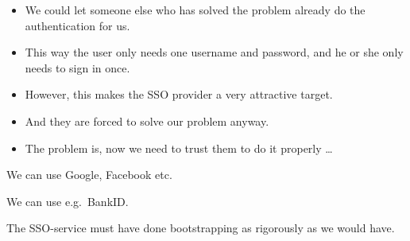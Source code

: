 \begin{frame}
  \begin{itemize}
    \item We could let someone else who has solved the problem already do the 
      authentication for us.

    \item This way the user only needs one username and password, and he or she 
      only needs to sign in once.

    \item However, this makes the SSO provider a very attractive target.

    \item And they are forced to solve our problem anyway.

    \item The problem is, now we need to trust them to do it properly \dots
  \end{itemize}
\end{frame}

\begin{frame}
  \begin{example}
    We can use Google, Facebook etc.
  \end{example}

  \begin{example}
    We can use e.g.\ BankID.
  \end{example}

  \begin{remark}
    The SSO-service must have done bootstrapping as rigorously as we would 
    have.
  \end{remark}
\end{frame}




\begin{frame}[allowframebreaks]
	\small
  \printbibliography{}
\end{frame}

